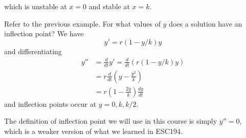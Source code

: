 \begin{itemize}
    which is unstable at $x=0$ and stable at $x=k$.
    \begin{example}
        Refer to the previous example. For what values of $y$ does a solution have an inflection point? We have 
        \begin{equation}
            y' = r(1-y/k)y
        \end{equation}
        and differentiating 
        \begin{align}
            y'' &= \frac{d}{dt}y' = \frac{d}{dt}(r(1-y/k)y) \\ 
                &= r\frac{d}{dt}\left(y-\frac{y^2}{k}\right) \\ 
                &= r\left(1-\frac{2y}{k}\right)\frac{dy}{dt}
        \end{align}
        and inflection points occur at $y=0,k,k/2.$
    \end{example}
    \begin{warning}
        The definition of inflection point we will use in this course is simply $y''=0$, which is a weaker version of what we learned in ESC194.
    \end{warning}
\end{itemize}